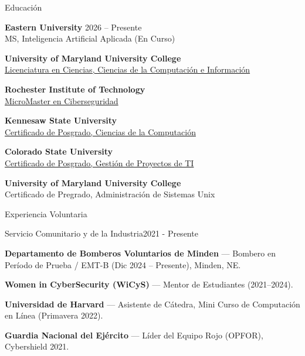 \documentclass{resume} %
\begin{document}
\begin{rSection}{Educaci\'on}

{\bf Eastern University} \hfill {2026 -- Presente} \\
MS, Inteligencia Artificial Aplicada (En Curso)

{\bf University of Maryland University College} \\
\href{https://github.com/CryptoJones/cv/raw/master/UMUC_UNDERGRAD_DIPLOMA.jpg}{Licenciatura en Ciencias, Ciencias de la Computaci\'on e Informaci\'on}

{\bf Rochester Institute of Technology} \\
\href{https://raw.githubusercontent.com/CryptoJones/cv/master/RIT_MMM.pdf}{MicroMaster en Ciberseguridad}

{\bf Kennesaw State University} \\
\href{https://raw.githubusercontent.com/CryptoJones/cv/master/KSU_GRADCERT_CSF.jpg}{Certificado de Posgrado, Ciencias de la Computaci\'on}

{\bf Colorado State University} \\
\href{https://raw.githubusercontent.com/CryptoJones/cv/master/CSU_GRADCERT_ITPM.jpg}{Certificado de Posgrado, Gesti\'on de Proyectos de TI}

{\bf University of Maryland University College} \\
Certificado de Pregrado, Administraci\'on de Sistemas Unix

\end{rSection}



\begin{rSection}{Experiencia Voluntaria}

\begin{rSubsection}{Servicio Comunitario y de la Industria}{2021 - Presente}{}{}
\item {\bf Departamento de Bomberos Voluntarios de Minden} --- Bombero en Per\'iodo de Prueba / EMT-B (Dic 2024 -- Presente), Minden, NE.
\item {\bf Women in CyberSecurity (WiCyS)} --- Mentor de Estudiantes (2021--2024).
\item {\bf Universidad de Harvard} --- Asistente de C\'atedra, Mini Curso de Computaci\'on en L\'inea (Primavera 2022).
\item {\bf Guardia Nacional del Ej\'ercito} --- L\'ider del Equipo Rojo (OPFOR), Cybershield 2021.
\end{rSubsection}

\end{rSection}
\end{document}
